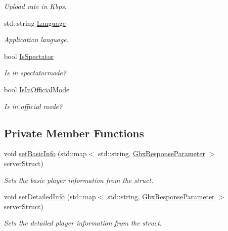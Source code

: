 \begin{DoxyCompactItemize}
\begin{DoxyCompactList}\small\item\em Upload rate in Kbps. \end{DoxyCompactList}\item 
\hypertarget{structPlayer_a583abe4cc5985fc83bfed62362efa358}{std\-::string \hyperlink{structPlayer_a583abe4cc5985fc83bfed62362efa358}{Language}}\label{structPlayer_a583abe4cc5985fc83bfed62362efa358}

\begin{DoxyCompactList}\small\item\em Application language. \end{DoxyCompactList}\item 
\hypertarget{structPlayer_a61ba0e32d336f5cd1eb152addf6848d2}{bool \hyperlink{structPlayer_a61ba0e32d336f5cd1eb152addf6848d2}{Is\-Spectator}}\label{structPlayer_a61ba0e32d336f5cd1eb152addf6848d2}

\begin{DoxyCompactList}\small\item\em Is in spectatormode? \end{DoxyCompactList}\item 
\hypertarget{structPlayer_a76e8b5298bcbe9ff694b6ed490ef7ca5}{bool \hyperlink{structPlayer_a76e8b5298bcbe9ff694b6ed490ef7ca5}{Is\-In\-Official\-Mode}}\label{structPlayer_a76e8b5298bcbe9ff694b6ed490ef7ca5}

\begin{DoxyCompactList}\small\item\em Is in official mode? \end{DoxyCompactList}\end{DoxyCompactItemize}
\subsection*{Private Member Functions}
\begin{DoxyCompactItemize}
\item 
void \hyperlink{structPlayer_ac4666bfba77342a37f3ab3628b26acd0}{set\-Basic\-Info} (std\-::map$<$ std\-::string, \hyperlink{classGbxResponseParameter}{Gbx\-Response\-Parameter} $>$ server\-Struct)
\begin{DoxyCompactList}\small\item\em Sets the basic player information from the struct. \end{DoxyCompactList}\item 
void \hyperlink{structPlayer_a179183e86a0b9a4b808593be96d65391}{set\-Detailed\-Info} (std\-::map$<$ std\-::string, \hyperlink{classGbxResponseParameter}{Gbx\-Response\-Parameter} $>$ server\-Struct)
\begin{DoxyCompactList}\small\item\em Sets the detailed player information from the struct. \end{DoxyCompactList}\end{DoxyCompactItemize}


